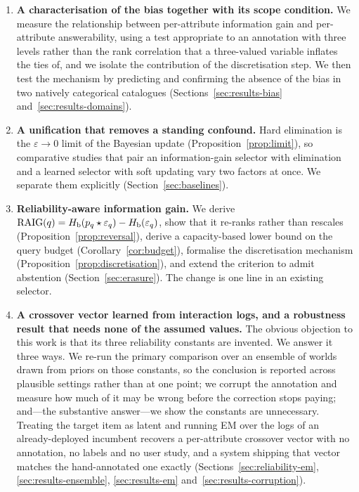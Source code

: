 \begin{enumerate}
\item \textbf{A characterisation of the bias together with its scope
condition.} We measure the relationship between per-attribute information gain
and per-attribute answerability, using a test appropriate to an annotation with
three levels rather than the rank correlation that a three-valued variable
inflates the ties of, and we isolate the contribution of the discretisation
step. We then test the
mechanism by predicting and confirming the absence of the bias in two
natively categorical catalogues (Sections~\ref{sec:results-bias}
and~\ref{sec:results-domains}).

\item \textbf{A unification that removes a standing confound.} Hard
elimination is the $\varepsilon \to 0$ limit of the Bayesian update
(Proposition~\ref{prop:limit}), so comparative studies that pair an
information-gain selector with elimination and a learned selector with soft
updating vary two factors at once. We separate them explicitly
(Section~\ref{sec:baselines}).

\item \textbf{Reliability-aware information gain.} We derive
$\mathrm{RAIG}(q) = H_{\mathrm{b}}(p_q \star \varepsilon_q) - H_{\mathrm{b}}(\varepsilon_q)$, show that it
re-ranks rather than rescales (Proposition~\ref{prop:reversal}), derive a
capacity-based lower bound on the query budget (Corollary~\ref{cor:budget}),
formalise the discretisation mechanism
(Proposition~\ref{prop:discretisation}), and extend the criterion to admit
abstention (Section~\ref{sec:erasure}). The change is one line in an existing
selector.

\item \textbf{A crossover vector learned from interaction logs, and a
robustness result that needs none of the assumed values.} The obvious
objection to this work is that its three reliability constants are invented.
We answer it three ways. We re-run the primary comparison over an ensemble of
worlds drawn from priors on those constants, so the conclusion is reported
across plausible settings rather than at one point; we corrupt the annotation
and measure how much of it may be wrong before the correction stops paying;
and---the substantive answer---we show the constants are unnecessary. Treating
the target item as latent and running EM over the logs of an already-deployed
incumbent recovers a per-attribute crossover vector with no annotation, no
labels and no user study, and a system shipping that vector matches the
hand-annotated one exactly (Sections~\ref{sec:reliability-em},
\ref{sec:results-ensemble}, \ref{sec:results-em}
and~\ref{sec:results-corruption}).


\end{enumerate}

